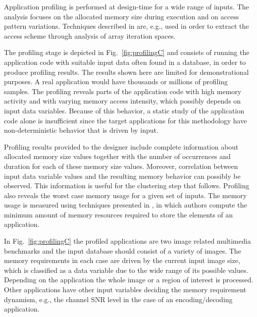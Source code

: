 Application profiling is performed at design-time for a wide range of inputs. 
The analysis focuses on the allocated memory size during execution and on access pattern variations. 
Techniques described in \cite{Ang13b} are, e.g., used in order to extract the access scheme through analysis of array iteration spaces.  

The profiling stage is depicted in Fig.~\ref{fig:profilingC} and consists of running the application code with suitable input data often found in a database, in order to produce profiling results. 
The results shown here are limited for demonstrational purposes. 
A real application would have thousands or millions of profiling samples. 
The profiling reveals parts of the application code with high memory activity and with varying memory access intensity, which possibly depends on input data variables. 
Because of this behavior, a static study of the application code alone is insufficient since the target applications for this methodology have non-deterministic behavior that is driven by input.

Profiling results provided to the designer include complete information about allocated memory size values together with the number of occurrences and duration for each of these memory size values. 
Moreover, correlation between input data variable values and the resulting memory behavior can possibly be observed. This information is useful for the clustering step that follows. 
Profiling also reveals the worst case memory usage for a given set of inputs. 
The memory usage is measured using techniques presented in \cite{Ang13b}, in which authors compute the minimum amount of memory resources required to store the elements of an application. 

In Fig.~\ref{fig:profilingC} the profiled applications are two image related multimedia benchmarks and the input database should consist of a variety of images. 
The memory requirements in each case are driven by the current input image size, which is classified as a data variable due to the wide range of its possible values. 
Depending on the application the whole image or a region of interest is processed. 
Other applications have other input variables deciding the memory requirement dynamism, e.g., the channel SNR level in the case of an encoding/decoding application.

